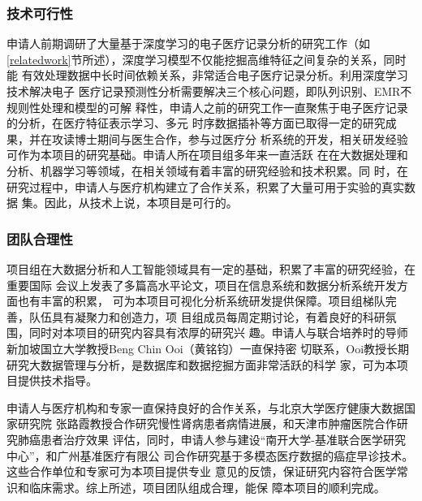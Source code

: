 \subsubsection{技术可行性}

申请人前期调研了大量基于深度学习的电子医疗记录分析的研究工作（如
\ref{relatedwork}节所述），深度学习模型不仅能挖掘高维特征之间复杂的关系，同时能
有效处理数据中长时间依赖关系，非常适合电子医疗记录分析。利用深度学习技术解决电子
医疗记录预测性分析需要解决三个核心问题，即队列识别、EMR不规则性处理和模型的可解
释性，申请人之前的研究工作一直聚焦于电子医疗记录的分析，在医疗特征表示学习、多元
时序数据插补等方面已取得一定的研究成果，并在攻读博士期间与医生合作，参与过医疗分
析系统的开发，相关研发经验可作为本项目的研究基础。申请人所在项目组多年来一直活跃
在在大数据处理和分析、机器学习等领域，在相关领域有着丰富的研究经验和技术积累。同
时，在研究过程中，申请人与医疗机构建立了合作关系，积累了大量可用于实验的真实数据
集。因此，从技术上说，本项目是可行的。

\subsubsection{团队合理性}

项目组在大数据分析和人工智能领域具有一定的基础，积累了丰富的研究经验，在重要国际
会议上发表了多篇高水平论文，项目在信息系统和数据分析系统开发方面也有丰富的积累，
可为本项目可视化分析系统研发提供保障。项目组梯队完善，队伍具有凝聚力和创造力，项
目组成员每周定期讨论，有着良好的科研氛围，同时对本项目的研究内容具有浓厚的研究兴
趣。申请人与联合培养时的导师新加坡国立大学教授Beng Chin Ooi（黄铭钧）一直保持密
切联系，Ooi教授长期研究大数据管理与分析，是数据库和数据挖掘方面非常活跃的科学
家，可为本项目提供技术指导。

申请人与医疗机构和专家一直保持良好的合作关系，与北京大学医疗健康大数据国家研究院
张路霞教授合作研究慢性肾病患者病情进展，和天津市肿瘤医院合作研究肺癌患者治疗效果
评估，同时，申请人参与建设“南开大学-基准联合医学研究中心”，和广州基准医疗有限公
司合作研究基于多模态医疗数据的癌症早诊技术。这些合作单位和专家可为本项目提供专业
意见的反馈，保证研究内容符合医学常识和临床需求。综上所述，项目团队组成合理，能保
障本项目的顺利完成。